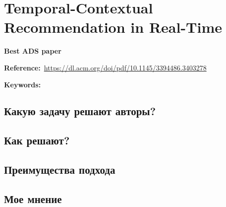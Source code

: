 \chapter{Temporal-Contextual Recommendation in Real-Time}

\textbf{Best ADS paper}

\textbf{Reference:}~\url{https://dl.acm.org/doi/pdf/10.1145/3394486.3403278}

\textbf{Keywords:} 

\section{Какую задачу решают авторы?}

\section{Как решают?}

\section{Преимущества подхода}


\section{Мое мнение}